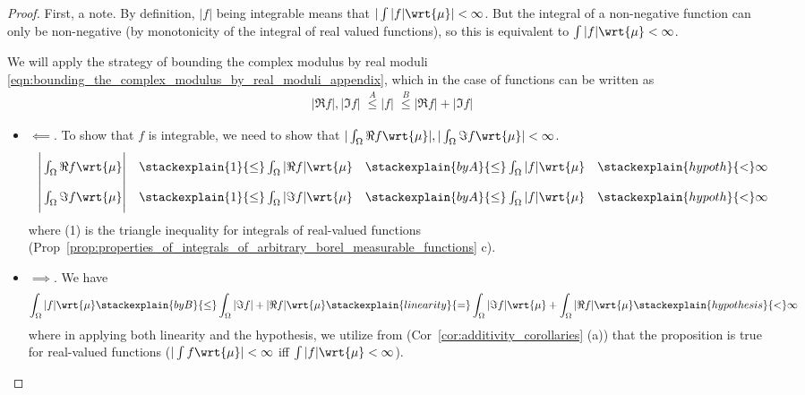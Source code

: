 \documentclass{article} %
\newcommand{\dmu}{\wrt{\mu}}
\begin{document}
\begin{proof}
First, a note.  By definition, $|f|$ being integrable means that $|\int |f| \dmu| < \infty$. But the integral of a non-negative function can only be non-negative (by monotonicity of the integral of real valued functions), so this is equivalent to $\int |f| \dmu < \infty$.

We will apply the strategy of bounding the complex modulus by real moduli \eqref{eqn:bounding_the_complex_modulus_by_real_moduli_appendix}, which in the case of functions can be written as 
\begin{align}
|\Re f|, |\Im f| \; \stackrel{A}{\leq} |f| \; \stackrel{B}{\leq} |\Re f|+|\Im f|
\label{eqn:bounding_the_complex_modulus_by_real_moduli_for_functions} 
\end{align}


\begin{itemize}
\item $\boxed{\impliedby}$.  To show that $f$ is integrable, we need to show that $| \int_\Omega \Re f \dmu |, | \int_\Omega \Im f \dmu |  < \infty$.
\[
\begin{array}{rrrr}
\bigg| \int_\Omega \Re f \dmu \bigg| & \stackexplain{1}{\leq} \int_\Omega |\Re f| \dmu & \stackexplain{by A}{\leq} \int_\Omega |f| \dmu &\stackexplain{hypoth}{<} \infty  \\
\bigg| \int_\Omega \Im f \dmu \bigg| & \stackexplain{1}{\leq} \int_\Omega |\Im f| \dmu & \stackexplain{by A}{\leq} \int_\Omega |f| \dmu &\stackexplain{hypoth}{<} \infty  \\
\end{array}	
\]
where (1) is the triangle inequality for integrals of real-valued functions (Prop~\ref{prop:properties_of_integrals_of_arbitrary_borel_measurable_functions} c).  

\item $\boxed{\implies}$.  We have 
\[ \int_\Omega |f| \dmu \stackexplain{by B}{\leq} \int_\Omega |\Im f|  +  |\Re f| \dmu \stackexplain{linearity}{=}  \int_\Omega |\Im f| \dmu + \int_\Omega |\Re f| \dmu  \stackexplain{hypothesis}{<} \infty \]
where in applying both linearity and the hypothesis, we utilize from (Cor~\ref{cor:additivity_corollaries} (a)) that the proposition is true for real-valued functions ($|\int f \dmu | < \infty$ iff $\int |f| \dmu < \infty $).
\end{itemize}

\end{proof}


%

\end{document}
